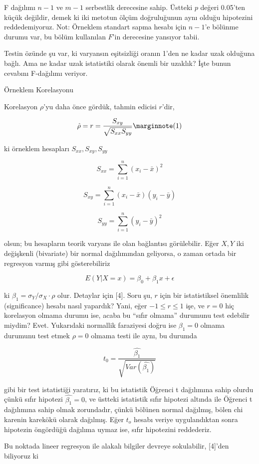 \documentclass[12pt,fleqn]{article}\usepackage{../../common}
\begin{document}
F dağılımı $n-1$ ve $m-1$ serbestlik derecesine sahip. Üstteki $p$ değeri
0.05'ten küçük değildir, demek ki iki metotun ölçüm doğruluğunun aynı olduğu
hipotezini reddedemiyoruz. Not: Örneklem standart sapma hesabı için $n-1$'e
bölünme durumu var, bu bölüm kullanılan $F$'in derecesine yansıyor tabii.

Testin özünde şu var, ki varyansın eşitsizliği oranın 1'den ne kadar uzak
olduğuna bağlı. Ama ne kadar uzak istatistiki olarak önemli bir uzaklık? İşte
bunun cevabını F-dağılımı veriyor. 

Örneklem Korelasyonu 

Korelasyon $\rho$'yu daha önce gördük, tahmin edicisi $r$'dir, 

$$ 
\hat{\rho} = r = \frac{S_{xy}}{\sqrt{S_{xx}S_{yy}}} 
\mlabel{1} 
$$

ki örneklem hesapları $S_{xx},S_{xy},S_{yy}$ 

$$ S_{xx} = \sum_{i=1}^{n} (x_i-\bar{x})^2 $$

$$ S_{xy} = \sum_{i=1}^{n} (x_i-\bar{x})(y_i-\bar{y}) $$

$$ S_{yy} = \sum_{i=1}^{n} (y_i-\bar{y})^2 $$

olsun; bu hesapların teorik varyans ile olan bağlantısı görülebilir. Eğer
$X,Y$ iki değişkenli (bivariate) bir normal dağılımından geliyorsa, o zaman
ortada bir regresyon varmış gibi gösterebiliriz

$$ E(Y|X=x) = \beta_0 + \beta_1 x + \epsilon $$

ki $\beta_1 = \sigma_Y / \sigma_X \cdot \rho$ olur. Detaylar için [4]. Soru şu, $r$ için bir  istatistiksel 
önemlilik (significance) hesabı nasıl yapardık? Yani, eğer $-1 \le r \le 1$
işe,  ve $r=0$ hiç korelasyon olmama durumu ise, acaba bu ``sıfır olmama'' 
durumunu test edebilir miydim? Evet. Yukarıdaki normallik faraziyesi doğru 
ise $\beta_1 = 0$ olmama durumunu test etmek $\rho = 0$ olmama testi ile aynı, bu durumda

$$ t_0 = \frac{\hat{\beta_1}}{\sqrt{ Var(\hat{\beta_1} ) }} $$

gibi bir test istatistiği yaratırız, ki bu istatistik Öğrenci t dağılımına
sahip olurdu çünkü sıfır hipotezi $\hat{\beta_1} = 0$, ve üstteki
istatistik sıfır hipotezi altında ile Öğrenci t dağılımına sahip olmak
zorundadır, çünkü bölünen normal dağılmış, bölen chi karenin karekökü
olarak dağılmış. Eğer $t_o$ hesabı veriye uygulandıktan sonra hipotezin
öngördüğü dağılıma uymaz ise, sıfır hipotezini reddederiz. 

Bu noktada lineer regresyon ile alakalı bilgiler devreye sokulabilir,
[4]'den biliyoruz ki
\end{document}
